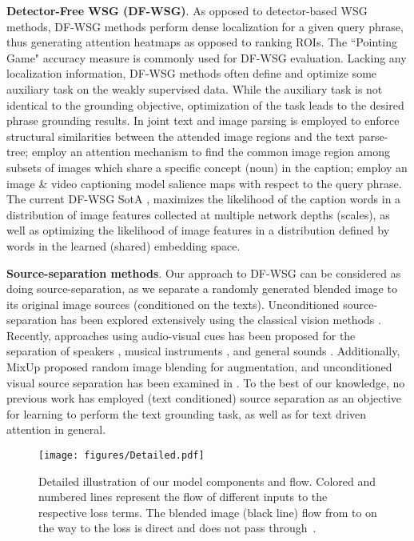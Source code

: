 \documentclass[10pt,twocolumn,letterpaper]{article}
\def\ourstask{DF-WSG}
\newcommand\secvspace{\vspace{-0.0cm}}
\newcommand\figvspace{\vspace{-0.2cm}}
\begin{document}
\noindent\textbf{Detector-Free WSG (\ourstask)}.
As opposed to detector-based WSG methods, \ourstask{} methods perform dense localization for a given query phrase, thus generating attention heatmaps as opposed to ranking ROIs. The ``Pointing Game" accuracy measure \cite{zhang2016top} is commonly used for \ourstask{} evaluation. Lacking any localization information, \ourstask{} methods often define and optimize some auxiliary task on the weakly supervised data. While the auxiliary task is not identical to the grounding objective, optimization of the task leads to the desired phrase grounding results.
In \cite{xiao2017weakly} joint text and image parsing is employed to enforce structural similarities between the attended image regions and the text parse-tree;
\cite{javed2018learning} employ an attention mechanism to find the common image region among subsets of images which share a specific concept (noun) in the caption; 
\cite{zhang2018top} employ an image \& video captioning model salience maps with respect to the query phrase. 
The current \ourstask{} SotA \cite{akbari2019multi}, maximizes the likelihood of the caption words in a distribution of image features collected at multiple network depths (scales), as well as optimizing the likelihood of image features in a distribution defined by words in the learned (shared) embedding space. 


\noindent\textbf{Source-separation methods}. Our approach to \ourstask{} can be considered as doing source-separation, as we separate a randomly generated blended image to its original image sources (conditioned on the texts).  Unconditioned source-separation has been explored extensively using the classical vision methods \cite{be2008blind, gai2011blind, hyvarinen2000independent, levin2007user, levin2002learning, pham1997blind}. Recently, approaches using audio-visual cues has been proposed for the separation of speakers \cite{chao2016speaker, ephrat2018looking, lu2019audio, Owens_2018_ECCV}, musical instruments \cite{ gan2020music, gao2019co,lluis2021music, zhao2019sound, zhao2018sound}, and general sounds \cite{gao2018learning, rouditchenko2019self, xu2019recursive}. Additionally, MixUp \cite{zhang2018mixup} proposed random image blending for augmentation, and unconditioned visual source separation has been examined in \cite{gandelsman2019double,jayaram2020source,Ma_2019_ICCV, lee2018generative,   halperin2019neural,Zou_2020_CVPR, zou2021adversarial}. 
To the best of our knowledge, no previous work has employed (text conditioned) source separation as an objective for learning to perform the text grounding task, as well as for text driven attention in general.
%
 \begin{figure*}[t!]
\begin{center}
\texttt{[image: figures/Detailed.pdf]} \end{center}
   \caption{Detailed illustration of our model components and flow. Colored and numbered lines represent the flow of different inputs to the respective loss terms. The blended image (black line) flow from  to  on the way to the  loss is direct and does not pass through~.}
\figvspace
\label{fig:model_details}
\end{figure*}
\secvspace
\end{document}
